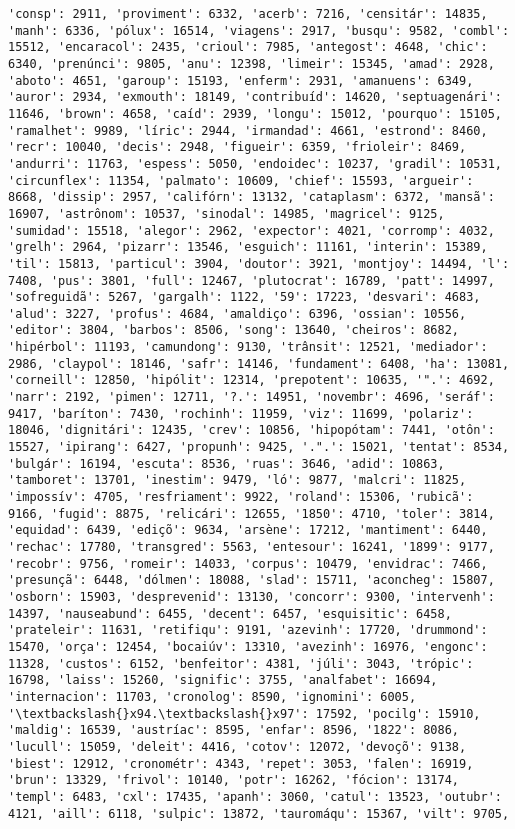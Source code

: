 \documentclass[11pt]{article}
\begin{document}
\begin{Verbatim}[commandchars=\\\{\}]
'consp': 2911, 'proviment': 6332, 'acerb': 7216, 'censitár': 14835, 'manh': 6336, 'pólux': 16514, 'viagens': 2917, 'busqu': 9582, 'combl': 15512, 'encaracol': 2435, 'crioul': 7985, 'antegost': 4648, 'chic': 6340, 'prenúnci': 9805, 'anu': 12398, 'limeir': 15345, 'amad': 2928, 'aboto': 4651, 'garoup': 15193, 'enferm': 2931, 'amanuens': 6349, 'auror': 2934, 'exmouth': 18149, 'contribuíd': 14620, 'septuagenári': 11646, 'brown': 4658, 'caíd': 2939, 'longu': 15012, 'pourquo': 15105, 'ramalhet': 9989, 'líric': 2944, 'irmandad': 4661, 'estrond': 8460, 'recr': 10040, 'decis': 2948, 'figueir': 6359, 'frioleir': 8469, 'andurri': 11763, 'espess': 5050, 'endoidec': 10237, 'gradil': 10531, 'circunflex': 11354, 'palmato': 10609, 'chief': 15593, 'argueir': 8668, 'dissip': 2957, 'califórn': 13132, 'cataplasm': 6372, 'mansã': 16907, 'astrônom': 10537, 'sinodal': 14985, 'magricel': 9125, 'sumidad': 15518, 'alegor': 2962, 'expector': 4021, 'corromp': 4032, 'grelh': 2964, 'pizarr': 13546, 'esguich': 11161, 'interin': 15389, 'til': 15813, 'particul': 3904, 'doutor': 3921, 'montjoy': 14494, 'l': 7408, 'pus': 3801, 'full': 12467, 'plutocrat': 16789, 'patt': 14997, 'sofreguidã': 5267, 'gargalh': 1122, '59': 17223, 'desvari': 4683, 'alud': 3227, 'profus': 4684, 'amaldiço': 6396, 'ossian': 10556, 'editor': 3804, 'barbos': 8506, 'song': 13640, 'cheiros': 8682, 'hipérbol': 11193, 'camundong': 9130, 'trânsit': 12521, 'mediador': 2986, 'claypol': 18146, 'safr': 14146, 'fundament': 6408, 'ha': 13081, 'corneill': 12850, 'hipólit': 12314, 'prepotent': 10635, '".': 4692, 'narr': 2192, 'pimen': 12711, '?.': 14951, 'novembr': 4696, 'seráf': 9417, 'baríton': 7430, 'rochinh': 11959, 'viz': 11699, 'polariz': 18046, 'dignitári': 12435, 'crev': 10856, 'hipopótam': 7441, 'otôn': 15527, 'ipirang': 6427, 'propunh': 9425, '.".': 15021, 'tentat': 8534, 'bulgár': 16194, 'escuta': 8536, 'ruas': 3646, 'adid': 10863, 'tamboret': 13701, 'inestim': 9479, 'ló': 9877, 'malcri': 11825, 'impossív': 4705, 'resfriament': 9922, 'roland': 15306, 'rubicã': 9166, 'fugid': 8875, 'relicári': 12655, '1850': 4710, 'toler': 3814, 'equidad': 6439, 'ediçõ': 9634, 'arsène': 17212, 'mantiment': 6440, 'rechac': 17780, 'transgred': 5563, 'entesour': 16241, '1899': 9177, 'recobr': 9756, 'romeir': 14033, 'corpus': 10479, 'envidrac': 7466, 'presunçã': 6448, 'dólmen': 18088, 'slad': 15711, 'aconcheg': 15807, 'osborn': 15903, 'desprevenid': 13130, 'concorr': 9300, 'intervenh': 14397, 'nauseabund': 6455, 'decent': 6457, 'esquisitic': 6458, 'prateleir': 11631, 'retifiqu': 9191, 'azevinh': 17720, 'drummond': 15470, 'orça': 12454, 'bocaiúv': 13310, 'avezinh': 16976, 'engonc': 11328, 'custos': 6152, 'benfeitor': 4381, 'júli': 3043, 'trópic': 16798, 'laiss': 15260, 'signific': 3755, 'analfabet': 16694, 'internacion': 11703, 'cronolog': 8590, 'ignomini': 6005, '\textbackslash{}x94.\textbackslash{}x97': 17592, 'pocilg': 15910, 'maldig': 16539, 'austríac': 8595, 'enfar': 8596, '1822': 8086, 'lucull': 15059, 'deleit': 4416, 'cotov': 12072, 'devoçõ': 9138, 'biest': 12912, 'cronométr': 4343, 'repet': 3053, 'falen': 16919, 'brun': 13329, 'frivol': 10140, 'potr': 16262, 'fócion': 13174, 'templ': 6483, 'cxl': 17435, 'apanh': 3060, 'catul': 13523, 'outubr': 4121, 'aill': 6118, 'sulpic': 13872, 'tauromáqu': 15367, 'vilt': 9705, 
\end{Verbatim}
\end{document}
